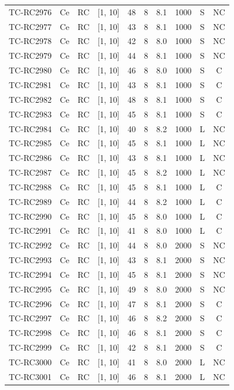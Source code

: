\begin{longtable}{lccccccccc}
TC-RC2976 & Ce & RC & [1, 10] & 48 & 8 & 8.1 & 1000 & S & NC \\
TC-RC2977 & Ce & RC & [1, 10] & 43 & 8 & 8.1 & 1000 & S & NC \\
TC-RC2978 & Ce & RC & [1, 10] & 42 & 8 & 8.0 & 1000 & S & NC \\
TC-RC2979 & Ce & RC & [1, 10] & 44 & 8 & 8.1 & 1000 & S & NC \\
TC-RC2980 & Ce & RC & [1, 10] & 46 & 8 & 8.0 & 1000 & S & C \\
TC-RC2981 & Ce & RC & [1, 10] & 43 & 8 & 8.1 & 1000 & S & C \\
TC-RC2982 & Ce & RC & [1, 10] & 48 & 8 & 8.1 & 1000 & S & C \\
TC-RC2983 & Ce & RC & [1, 10] & 45 & 8 & 8.1 & 1000 & S & C \\
TC-RC2984 & Ce & RC & [1, 10] & 40 & 8 & 8.2 & 1000 & L & NC \\
TC-RC2985 & Ce & RC & [1, 10] & 45 & 8 & 8.1 & 1000 & L & NC \\
TC-RC2986 & Ce & RC & [1, 10] & 43 & 8 & 8.1 & 1000 & L & NC \\
TC-RC2987 & Ce & RC & [1, 10] & 45 & 8 & 8.2 & 1000 & L & NC \\
TC-RC2988 & Ce & RC & [1, 10] & 45 & 8 & 8.1 & 1000 & L & C \\
TC-RC2989 & Ce & RC & [1, 10] & 44 & 8 & 8.2 & 1000 & L & C \\
TC-RC2990 & Ce & RC & [1, 10] & 45 & 8 & 8.0 & 1000 & L & C \\
TC-RC2991 & Ce & RC & [1, 10] & 41 & 8 & 8.0 & 1000 & L & C \\
TC-RC2992 & Ce & RC & [1, 10] & 44 & 8 & 8.0 & 2000 & S & NC \\
TC-RC2993 & Ce & RC & [1, 10] & 43 & 8 & 8.1 & 2000 & S & NC \\
TC-RC2994 & Ce & RC & [1, 10] & 45 & 8 & 8.1 & 2000 & S & NC \\
TC-RC2995 & Ce & RC & [1, 10] & 49 & 8 & 8.0 & 2000 & S & NC \\
TC-RC2996 & Ce & RC & [1, 10] & 47 & 8 & 8.1 & 2000 & S & C \\
TC-RC2997 & Ce & RC & [1, 10] & 46 & 8 & 8.2 & 2000 & S & C \\
TC-RC2998 & Ce & RC & [1, 10] & 46 & 8 & 8.1 & 2000 & S & C \\
TC-RC2999 & Ce & RC & [1, 10] & 42 & 8 & 8.1 & 2000 & S & C \\
TC-RC3000 & Ce & RC & [1, 10] & 41 & 8 & 8.0 & 2000 & L & NC \\
TC-RC3001 & Ce & RC & [1, 10] & 46 & 8 & 8.1 & 2000 & L & NC \\

\end{longtable}
